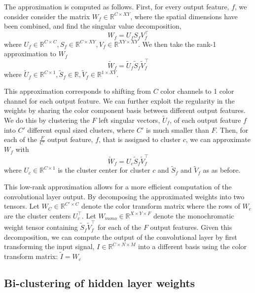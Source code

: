 The approximation is computed as follows. First, for every output feature, $f$, we consider consider the matrix $W_f \in \mathbb{R}^{C \times XY }$, where the spatial dimensions have been combined, and find the singular value decomposition, 
\begin{equation*}
	W_f = U_f S_f V_f^{\top}
\end{equation*}
where $U_f \in \mathbb{R}^{C \times C}, S_f \in \mathbb{R}^{C \times XY}, V_f \in \mathbb{R}^{XY \times XY}$. We then take the rank-1 approximation to $W_f$ 
\begin{equation*}
	\tilde{W}_f = \tilde{U}_f \tilde{S}_f \tilde{V}_f^{\top}
\end{equation*}
where $\tilde{U}_f \in \mathbb{R}^{C \times 1}, \tilde{S}_f \in \mathbb{R}, \tilde{V}_f \in \mathbb{R}^{1 \times XY}$.

This approximation corresponds to shifting from $C$ color channels to 1 color channel for each output feature. We can further exploit the regularity in the weights by sharing the color component basis between different output features. We do this by clustering the $F$ left singular vectors,  $\tilde{U}_f$, of each output feature $f$ into $C'$ different equal sized clusters, where $C'$ is much smaller than $F$. Then, for each of the $\frac{F}{C'}$ output feature, $f$, that is assigned to cluster $c$, we can approximate $W_f$ with
\begin{equation*}
	\tilde{W}_f = U_c \tilde{S}_f \tilde{V}_f^{\top}
\end{equation*}
where $U_c \in \mathbb{R}^{C \times 1}$ is the cluster center for cluster $c$ and $\tilde{S}_f$ and $\tilde{V}_f$ as as before. 

This low-rank approximation allows for a more efficient computation of the convolutional layer output. By decomposing the approximated weights into two tensors. Let $W_C \in \mathbb{R}^{C' \times C}$ denote the color transform matrix where the rows of $W_c$ are the cluster centers $U_c^{\top}$. Let $W_{mono} \in \mathbb{R}^{X \times Y \times F}$ denote the monochromatic weight tensor containing $ \tilde{S}_f \tilde{V}_f^{\top}$ for each of the $F$ output features. Given this decomposition, we can compute the output of the convolutional layer by first transforming the input signal, $I \in \mathbb{R}^{C \times N \times M}$ into a different basis using the color transform matrix: $\tilde{I} = W_c $


\subsection{Bi-clustering of hidden layer weights}






